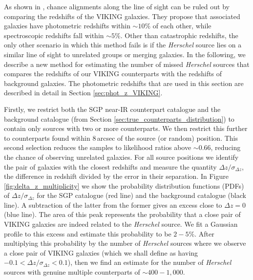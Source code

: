 As shown in \citealt{Fleuren_2012}, chance alignments along the line of sight can be ruled out by comparing the redshifts of the VIKING galaxies. They propose that associated galaxies have photometric redshifts within $\sim 10\%$ of each other, while spectroscopic redshifts fall within $\sim 5\%$. Other than catastrophic redshifts, the only other scenario in which this method fails is if the \textit{Herschel} source lies on a similar line of sight to unrelated groups or merging galaxies. In the following, we describe a new method for estimating the number of missed \textit{Herschel} sources that compares the redshifts of our VIKING counterparts with the redshifts of background galaxies. The photometric redshifts that are used in this section are described in detail in Section \ref{sec:phot_z_VIKING}.

Firstly, we restrict both the SGP near-IR counterpart catalogue and the background catalogue (from Section \ref{sec:true_counterparts_distribution}) to contain only sources with two or more counterparts. We then restrict this further to counterparts found within $8\,$arcsec of the source (or random) position. This second selection reduces the samples to likelihood ratios above $\sim 0.66$, reducing the chance of observing unrelated galaxies. For all source positions we identify the pair of galaxies with the closest redshifts and measure the quantity $\Delta z/\sigma_{\Delta z}$, the difference in redshift divided by the error in their separation. In Figure \ref{fig:delta_z_multiplicity} we show the probability distribution functions (PDFs) of $\Delta z/\sigma_{\Delta z}$ for the SGP catalogue (red line) and the background catalogue (black line). A subtraction of the latter from the former gives an excess close to $\Delta z = 0$ (blue line). The area of this peak represents the probability that a close pair of VIKING galaxies are indeed related to the \textit{Herschel} source. We fit a Gaussian profile to this excess and estimate this probability to be $2 - 5\%$. After multiplying this probability by the number of \textit{Herschel} sources where we observe a close pair of VIKING galaxies (which we shall define as having $-0.1 < \Delta z/\sigma_{\Delta z} < 0.1$), then we find an estimate for the number of \textit{Herschel} sources with genuine multiple counterparts of $\sim 400 - 1,000$.


